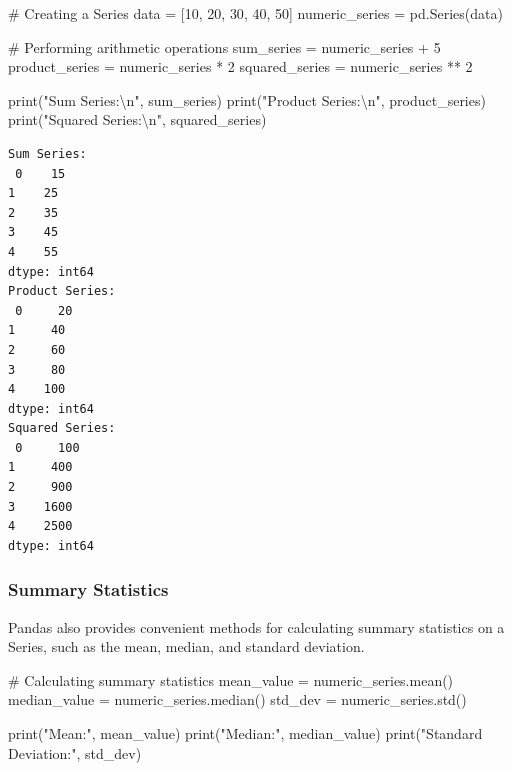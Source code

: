 \documentclass[
  letterpaper,
  DIV=11,
  numbers=noendperiod]{scrreprt}
\newenvironment{Shaded}{\begin{snugshade}}{\end{snugshade}}
\newcommand{\BuiltInTok}[1]{\textcolor[rgb]{0.00,0.23,0.31}{#1}}
\newcommand{\CharTok}[1]{\textcolor[rgb]{0.13,0.47,0.30}{#1}}
\newcommand{\CommentTok}[1]{\textcolor[rgb]{0.37,0.37,0.37}{#1}}
\newcommand{\DecValTok}[1]{\textcolor[rgb]{0.68,0.00,0.00}{#1}}
\newcommand{\NormalTok}[1]{\textcolor[rgb]{0.00,0.23,0.31}{#1}}
\newcommand{\OperatorTok}[1]{\textcolor[rgb]{0.37,0.37,0.37}{#1}}
\newcommand{\StringTok}[1]{\textcolor[rgb]{0.13,0.47,0.30}{#1}}
\begin{document}
\begin{Shaded}
\begin{Highlighting}[]
\CommentTok{\# Creating a Series}
\NormalTok{data }\OperatorTok{=}\NormalTok{ [}\DecValTok{10}\NormalTok{, }\DecValTok{20}\NormalTok{, }\DecValTok{30}\NormalTok{, }\DecValTok{40}\NormalTok{, }\DecValTok{50}\NormalTok{]}
\NormalTok{numeric\_series }\OperatorTok{=}\NormalTok{ pd.Series(data)}

\CommentTok{\# Performing arithmetic operations}
\NormalTok{sum\_series }\OperatorTok{=}\NormalTok{ numeric\_series }\OperatorTok{+} \DecValTok{5}
\NormalTok{product\_series }\OperatorTok{=}\NormalTok{ numeric\_series }\OperatorTok{*} \DecValTok{2}
\NormalTok{squared\_series }\OperatorTok{=}\NormalTok{ numeric\_series }\OperatorTok{**} \DecValTok{2}

\BuiltInTok{print}\NormalTok{(}\StringTok{"Sum Series:}\CharTok{\textbackslash{}n}\StringTok{"}\NormalTok{, sum\_series)}
\BuiltInTok{print}\NormalTok{(}\StringTok{"Product Series:}\CharTok{\textbackslash{}n}\StringTok{"}\NormalTok{, product\_series)}
\BuiltInTok{print}\NormalTok{(}\StringTok{"Squared Series:}\CharTok{\textbackslash{}n}\StringTok{"}\NormalTok{, squared\_series)}
\end{Highlighting}
\end{Shaded}

\begin{verbatim}
Sum Series:
 0    15
1    25
2    35
3    45
4    55
dtype: int64
Product Series:
 0     20
1     40
2     60
3     80
4    100
dtype: int64
Squared Series:
 0     100
1     400
2     900
3    1600
4    2500
dtype: int64
\end{verbatim}

\hypertarget{summary-statistics}{%
\subsubsection{Summary Statistics}\label{summary-statistics}}

Pandas also provides convenient methods for calculating summary
statistics on a Series, such as the mean, median, and standard
deviation.

\begin{Shaded}
\begin{Highlighting}[]
\CommentTok{\# Calculating summary statistics}
\NormalTok{mean\_value }\OperatorTok{=}\NormalTok{ numeric\_series.mean()}
\NormalTok{median\_value }\OperatorTok{=}\NormalTok{ numeric\_series.median()}
\NormalTok{std\_dev }\OperatorTok{=}\NormalTok{ numeric\_series.std()}

\BuiltInTok{print}\NormalTok{(}\StringTok{"Mean:"}\NormalTok{, mean\_value)}
\BuiltInTok{print}\NormalTok{(}\StringTok{"Median:"}\NormalTok{, median\_value)}
\BuiltInTok{print}\NormalTok{(}\StringTok{"Standard Deviation:"}\NormalTok{, std\_dev)}
\end{Highlighting}
\end{Shaded}
\end{document}
